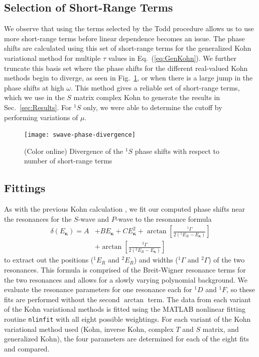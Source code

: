 \documentclass[preprint,showpacs,showkeys,preprintnumbers,amsmath,amssymb,longbibliography,pra,aps]{revtex4-1}
\begin{document}
\subsection{Selection of Short-Range Terms}
\label{sec:Truncation}
We observe that using the terms selected by the Todd procedure allows us to
use more short-range terms before linear dependence becomes an issue.
The phase shifts are calculated using this set of short-range terms for the 
generalized Kohn variational method for multiple $\tau$ values in
Eq.~(\ref{eq:GenKohn}). We further truncate this basis set where the phase
shifts for the different real-valued Kohn methods begin to diverge, as seen in
Fig.~\ref{fig:swave-phase-divergence}, or when there is a large jump in the
phase shifts at high $\omega$. This method gives a reliable set of
short-range terms, which we use in the $S$ matrix complex Kohn to generate
the results in Sec.~\ref{sec:Results}. For $^1S$ only, we were able to determine
the cutoff by performing variations of $\mu$.
\begin{figure}[H]
	\centering
	\texttt{[image: swave-phase-divergence]}
	\caption{(Color online) Divergence of the $^1S$ phase shifts with respect
to number of short-range terms}
	\label{fig:swave-phase-divergence}
\end{figure}

\subsection{Fittings}
As with the previous Kohn calculation \cite{VanReeth2004},
we fit our computed phase shifts near the resonances for
the $S$-wave and $P$-wave to the resonance formula
\begin{align}
\label{eq:ResonanceFit}
\delta(E_{\bm \kappa}) = A &+ B E_{\bm \kappa} + C E_{\bm \kappa}^2 + \arctan
  \left[ \frac{^1\Gamma}{2(^1E_R - E_{\bm \kappa})} \right]  \nonumber \\
& + \arctan \left[ \frac{^2\Gamma}{2(^2E_R - E_{\bm \kappa})} \right]
\end{align}
to extract out the positions ($^1E_R$ and $^2E_R$) and widths ($^1\Gamma$ and 
$^2\Gamma$) of the two resonances. This formula is comprised of the
Breit-Wigner resonance terms \cite{Breit1936,Macek1970} for the two resonances
and allows for a slowly varying polynomial background.
We evaluate the resonance parameters for one resonance each for $^1D$ and $^1F$,
so these fits are performed without the second $\arctan$ term.
The data from each variant of the Kohn variational 
methods is fitted using the MATLAB \cite{MATLAB} nonlinear fitting routine 
\texttt{nlinfit} with all eight possible weightings. For each variant of the 
Kohn variational method used (Kohn, inverse Kohn, complex $T$ and $S$ matrix,
and generalized Kohn), the four parameters are determined for each of the 
eight fits and compared.
\end{document}
